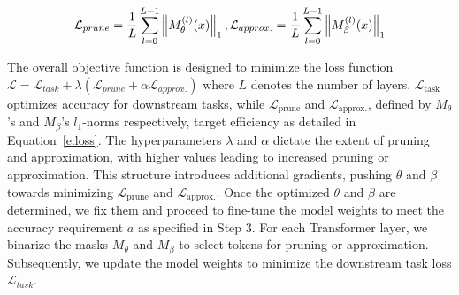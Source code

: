 \vspace{-0.25in}
\begin{equation}
\footnotesize
\label{e:loss}
\mathcal{L}_{prune} = \frac{1}{L}\sum_{l=0}^{L-1} \left \| M^{(l)}_{\theta}(x) \right \|_{1}, \mathcal{L}_{approx.} = \frac{1}{L}\sum_{l=0}^{L-1} \left \| M^{(l)}_{\beta}(x) \right \|_{1}
\vspace{-0.2in}
\end{equation}

The overall objective function is designed to minimize the loss function 
$\mathcal{L} = \mathcal{L}_{task} + \lambda(\mathcal{L}_{prune} + \alpha \mathcal{L}_{approx.}) $
where \(L\) denotes the number of layers. \(\mathcal{L}_{\text{task}}\) optimizes accuracy for downstream tasks, while \(\mathcal{L}_{\text{prune}}\) and \(\mathcal{L}_{\text{approx.}}\), defined by \(M_{\theta}\)'s and \(M_{\beta}\)'s \(l_1\)-norms respectively, target efficiency as detailed in Equation~\ref{e:loss}. The hyperparameters \(\lambda\) and \(\alpha\) dictate the extent of pruning and approximation, with higher values leading to increased pruning or approximation. This structure introduces additional gradients, pushing \(\theta\) and \(\beta\) towards minimizing \(\mathcal{L}_{\text{prune}}\) and \(\mathcal{L}_{\text{approx.}}\). Once the optimized \(\theta\) and \(\beta\) are determined, we fix them and proceed to fine-tune the model weights to meet the accuracy requirement \(a\) as specified in Step 3. For each Transformer layer, we binarize the masks \(M_{\theta}\) and \(M_{\beta}\) to select tokens for pruning or approximation. Subsequently, we update the model weights to minimize the downstream task loss \(\mathcal{L}_{task}\).

